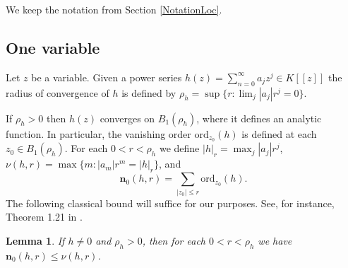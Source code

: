 \documentclass[11pt]{amsart}
\newtheorem{lemma}[theorem]{Lemma}
\theoremstyle{remark}
\numberwithin{equation}{section}
\newcommand{\nn}{\mathbf{n}}
\newcommand{\ord}{\mathrm{ord}}
\begin{document}
We keep the notation from Section \ref{NotationLoc}.

\subsection{One variable} Let $z$ be a variable. Given a power series $h(z)=\sum_{n=0}^\infty a_j z^j\in K[[z]]$ the radius of convergence of $h$ is defined by $\rho_h=\sup\{ r : \lim_j |a_j|r^j=0 \}$.

If $\rho_h>0$ then $h(z)$ converges on $B_1(\rho_h)$, where it defines an analytic function. In particular, the vanishing order $\ord_{z_0}(h)$ is defined at each $z_0\in B_1(\rho_h)$. For each $0<r<\rho_h$ we define $|h|_r=\max_j |a_j|r^j$, $\nu(h,r)=\max\{m : |a_m|r^m=|h|_r\}$, and 
$$
\nn_0(h,r)=\sum_{|z_0|\le r} \ord_{z_0}(h).
$$
The following classical bound will suffice for our purposes. See, for instance,  Theorem 1.21 in \cite{HuYang}.
\begin{lemma}\label{LemmaZeros1var} If $h\ne 0$ and $\rho_h>0$, then for each $0<r<\rho_h$ we have $\nn_0(h,r)\le \nu(h,r)$.
\end{lemma}

\end{document}
